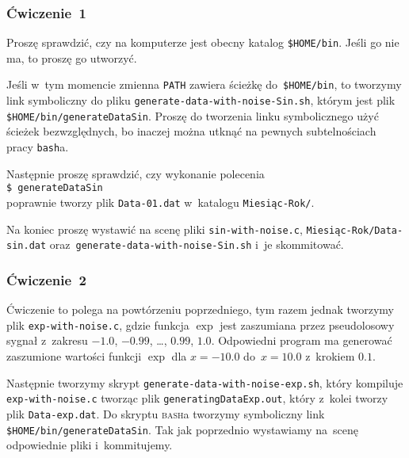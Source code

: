 \documentclass[10pt,t]{beamer}
\begin{document}
\begin{frame}
  \frametitle{Ćwiczenie~1}


  Proszę sprawdzić, czy na komputerze jest obecny katalog
  \texttt{\$HOME/bin}. Jeśli go nie ma, to proszę go utworzyć.

  Jeśli w~tym momencie zmienna \texttt{PATH} zawiera ścieżkę
  do~\texttt{\$HOME/bin}, to tworzymy link symboliczny do pliku
  \texttt{generate-data-with-noise-Sin.sh}, którym jest plik
  \texttt{\$HOME/bin/generateDataSin}. Proszę do tworzenia linku
  symbolicznego użyć ścieżek bezwzględnych, bo inaczej można utknąć
  na pewnych subtelnościach pracy \texttt{bash}a.

  Następnie proszę sprawdzić, czy wykonanie polecenia \\
  \texttt{\$ generateDataSin} \\
  poprawnie tworzy plik \texttt{Data-01.dat} w~katalogu
  \texttt{Miesiąc-Rok/}.

  Na koniec proszę wystawić na scenę pliki \texttt{sin-with-noise.c},
  \texttt{Miesiąc-Rok/Data-sin.dat}
  oraz~\texttt{generate-data-with-noise-Sin.sh} i~je skommitować.


\end{frame}





\begin{frame}
  \frametitle{Ćwiczenie~2}


  Ćwiczenie to polega na powtórzeniu poprzedniego, tym razem jednak
  tworzymy plik \texttt{exp-with-noise.c}, gdzie funkcja $\exp$ jest
  zaszumiana przez pseudolosowy sygnał z~zakresu $-1.0$, $-0.99$, \ldots,
  $0.99$, $1.0$. Odpowiedni program ma generować zaszumione wartości
  funkcji $\exp$ dla $x = -10.0$ do~$x = 10.0$ z~krokiem $0.1$.

  Następnie tworzymy skrypt \texttt{generate-data-with-noise-exp.sh}, który
  kompiluje \texttt{exp-with-noise.c} tworząc plik
  \texttt{generatingDataExp.out}, który z~kolei tworzy plik
  \texttt{Data-exp.dat}. Do skryptu \textsc{bash}a tworzymy symboliczny
  link \texttt{\$HOME/bin/generateDataSin}. Tak jak poprzednio wystawiamy
  na~scenę odpowiednie pliki i~kommitujemy.

\end{frame}
\end{document}
